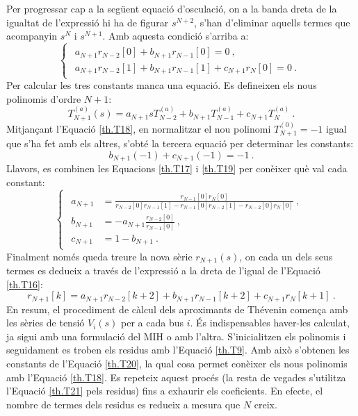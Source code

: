 Per progressar cap a la següent equació d'osculació, on a la banda dreta de la igualtat de l'expressió hi ha de figurar $s^{N+2}$, s'han d'eliminar aquells termes que acompanyin $s^{N}$ i $s^{N+1}$. Amb aquesta condició s'arriba a:
\begin{equation}
    \begin{cases}
\begin{split}
a_{N+1}r_{N-2}[0]+b_{N+1}r_{N-1}[0]=0\ ,\\
a_{N+1}r_{N-2}[1]+b_{N+1}r_{N-1}[1]+c_{N+1}r_{N}[0]=0\ .
\end{split}
\end{cases}
\label{th.T17}
\end{equation}
Per calcular les tres constants manca una equació. Es defineixen els nous polinomis d'ordre $N+1$:
\begin{equation}
T^{(a)}_{N+1}(s)=a_{N+1}sT^{(a)}_{N-2}+b_{N+1}T^{(a)}_{N-1}+c_{N+1}T^{(a)}_{N}\ .
\label{th.T18}
\end{equation}
Mitjançant l'Equació \ref{th.T18}, en normalitzar el nou polinomi $T^{(0)}_{N+1}=-1$ igual que s'ha fet amb els altres, s'obté la tercera equació per determinar les constants:
\begin{equation}
b_{N+1}(-1)+c_{N+1}(-1)=-1\ .
\label{th.T19}
\end{equation}
Llavors, es combinen les Equacions \ref{th.T17} i \ref{th.T19} per conèixer què val cada constant:
\begin{equation}
    \begin{cases}
    \begin{split}
    a_{N+1}&=\frac{r_{N-1}[0]r_{N}[0]}{r_{N-2}[0]r_{N-1}[1]-r_{N-1}[0]r_{N-2}[1]-r_{N-2}[0]r_{N}[0]}\ ,\\
    b_{N+1}&=-a_{N+1}\frac{r_{N-2}[0]}{r_{N-1}[0]}\ ,\\
    c_{N+1}&=1-b_{N+1}\ .
    \end{split}
\end{cases}
    \label{th.T20}
\end{equation}
Finalment només queda treure la nova sèrie $r_{N+1}(s)$, on cada un dels seus termes es dedueix a través de l'expressió a la dreta de l'igual de l'Equació \ref{th.T16}:
\begin{equation}
r_{N+1}[k]=a_{N+1}r_{N-2}[k+2]+b_{N+1}r_{N-1}[k+2]+c_{N+1}r_N[k+1]\ .
\label{th.T21}
\end{equation}
En resum, el procediment de càlcul dels aproximants de Thévenin comença amb les sèries de tensió $V_i(s)$ per a cada bus $i$. És indispensables haver-les calculat, ja sigui amb una formulació del MIH o amb l'altra. S'inicialitzen els polinomis i seguidament es troben els residus amb l'Equació \ref{th.T9}. Amb això s'obtenen les constants de l'Equació \ref{th.T20}, la qual cosa permet conèixer els nous polinomis amb l'Equació \ref{th.T18}. Es repeteix aquest procés (la resta de vegades s'utilitza l'Equació \ref{th.T21} pels residus) fins a exhaurir els coeficients. En efecte, el nombre de termes dels residus es redueix a mesura que $N$ creix.

